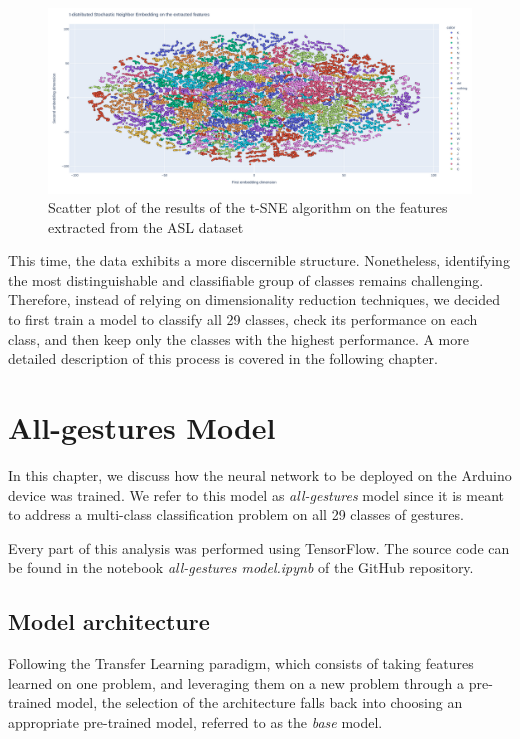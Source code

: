 \documentclass{Configuration_Files/PoliMi3i_thesis}
\begin{document}
\begin{figure}[H]
    \centering
    \includegraphics[width=\textwidth]{Figures/eda/cnn_tsne.png}
    \caption{Scatter plot of the results of the t-SNE algorithm on the features extracted from the ASL dataset}
    \label{fig:cnn_tsne}
\end{figure}

This time, the data exhibits a more discernible structure. Nonetheless, identifying the most distinguishable and classifiable group of classes remains challenging. Therefore, instead of relying on dimensionality reduction techniques, we decided to first train a model to classify all 29 classes, check its performance on each class, and then keep only the classes with the highest performance. A more detailed description of this process is covered in the following chapter.


\chapter{All-gestures Model}
\label{ch:all-model}%
In this chapter, we discuss how the neural network to be deployed on the Arduino device was trained. We refer to this model as \textit{all-gestures} model since it is meant to address a multi-class classification problem on all 29 classes of gestures. 

Every part of this analysis was performed using TensorFlow. The source code can be found in the notebook \textit{all-gestures model.ipynb }of the GitHub repository. 

\section{Model architecture}
\label{sec:all-arch}
Following the Transfer Learning paradigm, which consists of taking features learned on one problem, and leveraging them on a new problem through a pre-trained model, the selection of the architecture falls back into choosing an appropriate pre-trained model, referred to as the \textit{base} model.
\end{document}
